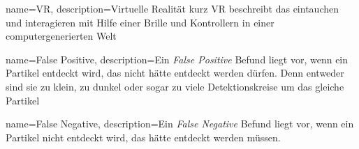 \makeglossaries

{
    name=VR,
    description={Virtuelle Realität kurz VR beschreibt das eintauchen und interagieren mit Hilfe einer Brille und Kontrollern in einer computergenerierten Welt}
}

{
    name=False Positive,
    description={Ein \textit{False Positive} Befund liegt vor, wenn ein Partikel entdeckt wird, das nicht hätte entdeckt werden dürfen. Denn entweder sind sie zu klein, zu dunkel oder sogar zu viele Detektionskreise um das gleiche Partikel}
}

{
    name=False Negative,
    description={Ein \textit{False Negative} Befund liegt vor, wenn ein Partikel nicht entdeckt wird, das hätte entdeckt werden müssen.}
}